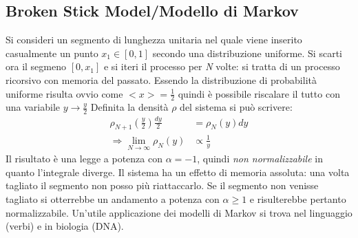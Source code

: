 \documentclass[12pt, a4paper]{article}
\theoremstyle{theorem}
\begin{document}
		\subsection{Broken Stick Model/Modello di Markov}
			Si consideri un segmento di lunghezza unitaria nel quale viene inserito casualmente un punto $x_1\in[0,1]$ secondo una distribuzione uniforme.
			Si scarti ora il segmeno $[0,x_1]$ e si iteri il processo per \textit{N} volte: si tratta di un processo ricorsivo con memoria del passato.
			Essendo la distribuzione di probabilità uniforme risulta ovvio come $<x>=\frac{1}{2}$ quindi è possibile riscalare il tutto con una variabile $y\rightarrow\frac{y}{2}$
			Definita la densità $\rho$ del sistema si può scrivere:
			\begin{equation}
				\begin{split}
					\rho_{N+1}\left(\frac{y}{2}\right)\frac{dy}{2}&=\rho_N(y)dy\\
					\Rightarrow\lim_{N\to\infty}\rho_N(y)&\propto\frac{1}{y}
				\end{split}
			\end{equation}
			Il risultato è una legge a potenza con $\alpha=-1$, quindi \textit{non normalizzabile} in quanto l'integrale diverge.
			Il sistema ha un effetto di memoria assoluta: una volta tagliato il segmento non posso più riattaccarlo.
			Se il segmento non venisse tagliato si otterrebbe un andamento a potenza con $\alpha\geq 1$ e risulterebbe pertanto normalizzabile.
			Un'utile applicazione dei modelli di Markov si trova nel linguaggio (verbi) e in biologia (DNA).
\end{document}

